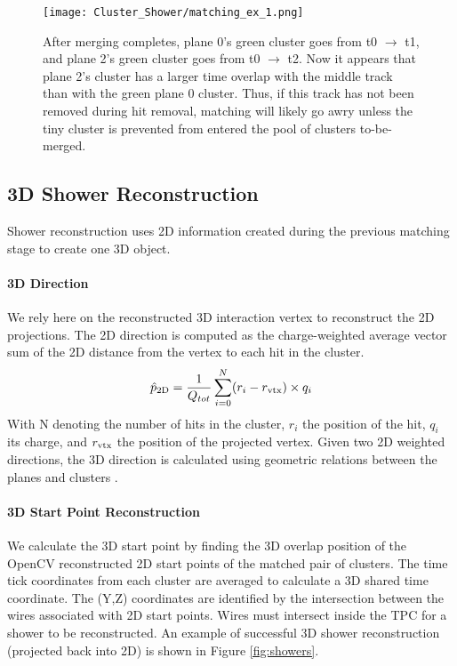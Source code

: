 \documentclass{article}
\begin{document}
\begin{figure}[H]
\centering
\texttt{[image: Cluster\_Shower/matching\_ex\_1.png]}
\caption{After merging completes, plane 0’s green cluster goes from t0 $\rightarrow$ t1, and plane 2’s green cluster goes from t0 $\rightarrow$ t2. Now it appears that plane 2’s cluster has a larger time overlap with the middle track than with the green plane 0 cluster.  Thus, if this track has not been removed during hit removal, matching will likely go awry unless the tiny cluster is prevented from entered the pool of clusters to-be-merged.
 }
\label{fig:matching_ex_1}
\end{figure}


\subsection{3D Shower Reconstruction}
Shower reconstruction uses 2D information created during the previous matching stage to create one 3D object. 
\paragraph{3D Direction}  We rely here on the reconstructed 3D interaction vertex to reconstruct the 2D projections. The 2D direction is computed as the charge-weighted average vector sum of the 2D distance from the vertex to each hit in the cluster.
\begin{equation}
  \hat{p}_{\rm 2D} = \frac{1}{Q_{tot}} \sum_{i=0}^{N} (r_i - r_{\rm vtx}) \times q_i 
\end{equation}
With N denoting the number of hits in the cluster, $r_i$ the position of the hit, $q_i$ its charge, and $r_{\rm vtx}$ the position of the projected vertex. Given two 2D weighted directions, the 3D direction is calculated using geometric relations between the planes and clusters \cite{bib:larliteGeoHelper}. 

\paragraph{3D Start Point Reconstruction} We calculate the 3D start point by finding the 3D overlap position of the OpenCV reconstructed 2D start points of the matched pair of clusters. The time tick coordinates from each cluster are averaged to calculate a 3D shared time coordinate. The (Y,Z) coordinates are identified by the intersection between the wires associated with 2D start points.  Wires must intersect inside the TPC for a shower to be reconstructed.  An example of successful 3D shower reconstruction (projected back into 2D) is shown in Figure \ref{fig:showers}.
\end{document}
